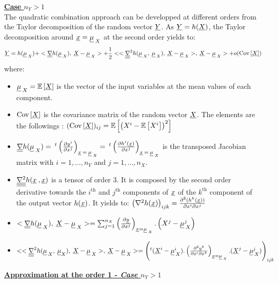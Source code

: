 {  \textbf{\underline{Case $n_Y > 1$}}\\

  The quadratic combination approach can be developped at different orders from the Taylor decomposition of the random vector $\underline{Y}$. As $\underline{Y}=h(\underline{X})$, the Taylor decomposition around $\underline{x} = \underline{\mu}_{\:X}$ at the second order yields to:
  $$
  \underline{Y} = h(\underline{\mu}_{\:X}) + <\underline{\underline{\nabla}}h(\underline{\mu}_{\:X}) , \: \underline{X} - \underline{\mu}_{\:X}> + \frac{1}{2}<<\underline{\underline{\underline{\nabla }}}^2 h(\underline{\mu}_{\:X},\: \underline{\mu}_{\:X}),\: \underline{X} - \underline{\mu}_{\:X}>,\: \underline{X} - \underline{\mu}_{\:X}> + o({\rm Cov}\left[ \underline{X} \right])
  $$
  where:
  \begin{itemize}
  \item $\underline{\mu}_{\:X} = {\mathbb E}\left[ \underline{X} \right]$ is the vector of the input variables at the mean values of each component.

  \item ${\rm Cov}\left[ \underline{X} \right]$ is the covariance matrix of the random vector $\underline{X}$. The elements are the followings : $({\rm Cov}\left[ \underline{X} \right])_{ij} = {\mathbb E}\left[ \left(X^i - {\mathbb E}\left[ X^i \right] \right)^2 \right]$

  \item $\underline{\underline{\nabla}} h(\underline{\mu}_{\:X}) = \: ^t \left( \frac{\partial y^i}{\partial x^j}\right)_{\underline{x}\: =\: \underline{\mu}_{\:X}} = \: ^t \left( \frac{\partial h^i(\underline{x})}{\partial x^j}\right)_{\underline{x}\: =\: \underline{\mu}_{\:X}} $ is the transposed Jacobian matrix with $i=1,\ldots,n_Y$ and $j=1,\ldots,n_X$.

  \item $\underline{\underline{\underline{\nabla^2}}} h(\underline{x}\:,\underline{x})$ is a tensor of order 3. It is composed by the second order derivative towards the $i^\textrm{th}$ and $j^\textrm{th}$ components of $\underline{x}$ of the $k^\textrm{th}$ component of the output vector $h(\underline{x})$. It yields to: $\left( \nabla^2 h(\underline{x}) \right)_{ijk} = \frac{\partial^2 (h^k(\underline{x}))}{\partial x^i \partial x^j}$

  \item $<\underline{\underline{\nabla}}h(\underline{\mu}_{\:X}) , \: \underline{X} - \underline{\mu}_{\:X}> = \sum_{j=1}^{n_X} \left( \frac{\partial {\underline{y}}}{\partial {x^j}}\right)_{\underline{x} = \underline{\mu}_{\:X}} . \left( X^j-\underline{\mu}_{\:X}^j \right)$

  \item $ <<\underline{\underline{\underline{\nabla }}}^2 h(\underline{\mu}_{\:X},\: \underline{\mu}_{X}),\: \underline{X} - \underline{\mu}_{\:X}>,\: \underline{X} - \underline{\mu}_{\:X}> = \left( ^t (\underline{X}^i - \underline{\mu}_{\:X}^i). \left(\frac{\partial^2 y^k}{\partial x^i \partial x^k}\right)_{\underline{x} = \underline{\mu}_{\:X}}. (\underline{X}^j - \underline{\mu}_{\:X}^j) \right)_{ijk}$

  \end{itemize}

  \underline{\textbf{Approximation at the order 1 - \textit{Case $n_Y > 1$}}}\\

}
